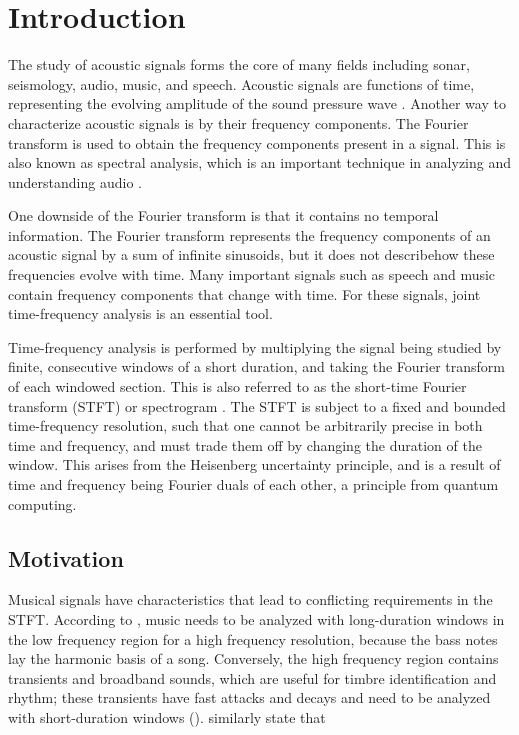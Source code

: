 \documentclass[report.tex]{subfiles}
\begin{document}
\section{Introduction}
\label{sec:intro}

The study of acoustic signals forms the core of many fields including sonar, seismology, audio, music, and speech. Acoustic signals are functions of time, representing the evolving amplitude of the sound pressure wave . Another way to characterize acoustic signals is by their frequency components. The Fourier transform is used to obtain the frequency components present in a signal. This is also known as spectral analysis, which is an important technique in analyzing and understanding audio .

One downside of the Fourier transform is that it contains no temporal information. The Fourier transform represents the frequency components of an acoustic signal by a sum of infinite sinusoids, but it does not describehow these frequencies evolve with time. Many important signals such as speech and music contain frequency components that change with time. For these signals, joint time-frequency analysis is an essential tool.

Time-frequency analysis is performed by multiplying the signal being studied by finite, consecutive windows of a short duration, and taking the Fourier transform of each windowed section. This is also referred to as the short-time Fourier transform (STFT) or spectrogram . The STFT is subject to a fixed and bounded time-frequency resolution, such that one cannot be arbitrarily precise in both time and frequency, and must trade them off by changing the duration of the window. This arises from the Heisenberg uncertainty principle, and is a result of time and frequency being Fourier duals of each other, a principle from quantum computing.

\subsection{Motivation}

Musical signals have characteristics that lead to conflicting requirements in the STFT. According to \textcite{doerflerphd}, music needs to be analyzed with long-duration windows in the low frequency region for a high frequency resolution, because the bass notes lay the harmonic basis of a song. Conversely, the high frequency region contains transients and broadband sounds, which are useful for timbre identification and rhythm; these transients have fast attacks and decays and need to be analyzed with short-duration windows (\cite{doerflerphd}). \textcite{cqtransient} similarly state that
\end{document}
